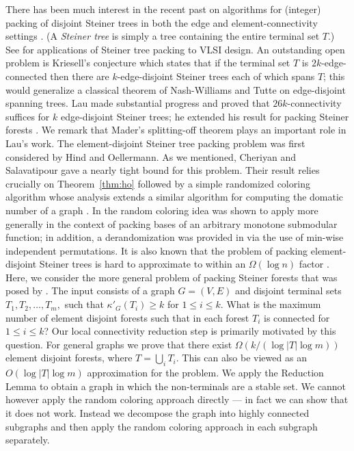 \documentclass[11pt]{article}
\newcommand{\elconn}{\kappa'}
\begin{document}
\smallskip
{} 
There has been much interest in the recent past on algorithms for
(integer) packing of disjoint Steiner trees in both the edge and
element-connectivity settings
\cite{Kriesell,JainMS03,Lau1,Lau2,CheriyanS04,cs,ChekuriS}. (A
\emph{Steiner tree} is simply a tree containing the entire terminal
set $T$.) See \cite{GrotschelMW97} for applications of Steiner tree
packing to VLSI design. An outstanding open problem is Kriesell's
conjecture which states that if the terminal set $T$ is
$2k$-edge-connected then there are $k$-edge-disjoint Steiner trees
each of which spans $T$; this would generalize a classical theorem of
Nash-Williams and Tutte on edge-disjoint spanning trees. Lau made
substantial progress \cite{Lau1} and proved that $26k$-connectivity
suffices for $k$ edge-disjoint Steiner trees; he extended his result
for packing Steiner forests \cite{Lau2}.  We remark that Mader's
splitting-off theorem plays an important role in Lau's work. The
element-disjoint Steiner tree packing problem was first considered by
Hind and Oellermann. As we mentioned, Cheriyan and Salavatipour
\cite{cs} gave a nearly tight bound for this problem. Their result relies
crucially on Theorem~\ref{thm:ho} followed by a simple randomized
coloring algorithm whose analysis extends a similar algorithm for
computing the domatic number of a graph \cite{FeigeHKS00}. In
\cite{CalinescuCV07} the random coloring idea was shown to apply more
generally in the context of packing bases of an arbitrary monotone
submodular function; in addition, a derandomization was provided in
\cite{CalinescuCV07} via the use of min-wise independent
permutations. It is also known that the problem of packing
element-disjoint Steiner trees is hard to approximate to within an
$\Omega(\log n)$ factor \cite{CheriyanS04}. Here, we consider the more
general problem of packing Steiner forests that was posed by
\cite{cs}.  The input consists of a graph $G=(V,E)$ and disjoint
terminal sets $T_1, T_2, \ldots, T_m,$ such that $\elconn_G(T_i) \ge
k$ for $1 \le i \le k$.  What is the maximum number of element
disjoint forests such that in each forest $T_i$ is connected for $1
\le i \le k$? Our local connectivity reduction step is primarily
motivated by this question.  For general graphs we prove that there
exist $\Omega(k/(\log |T| \log m))$ element disjoint forests, where $T
= \bigcup_i T_i$. This can also be viewed as an $O(\log |T| \log m)$
approximation for the problem. We apply the Reduction Lemma to obtain
a graph in which the non-terminals are a stable set. We cannot however
apply the random coloring approach directly --- in fact we can show
that it does not work. Instead we decompose the graph into highly
connected subgraphs and then apply the random coloring approach in
each subgraph separately.
\end{document}
